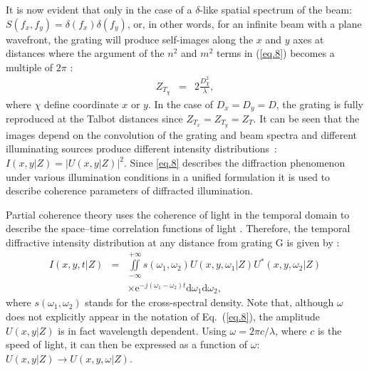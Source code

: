 \documentclass[9pt,twocolumn,twoside]{osajnl}
\begin{document}
It is now evident that only in the case of a $\delta$-like spatial spectrum of the beam: $S\left(f_x, f_y\right)=\delta\left(f_x\right) \delta\left(f_y\right)$, or, in other words, for an infinite beam with a plane wavefront, the grating will produce self-images along the $x$ and $y$ axes at distances where the argument of the $n^2$ and $m^2$ terms in (\ref{eq.8}) becomes a multiple of $2\pi$ \cite{Kovalenko13}:
\begin{eqnarray}
Z_{T_\chi} & =&2\frac{D^2_\chi}{\lambda},
\end{eqnarray}
where $\chi$ define coordinate $x$ or $y$. In the case of $D_x=D_y=D$, the grating is fully reproduced at the Talbot distances since $Z_{T_x}=Z_{T_y}=Z_T$. It can be seen that the images depend on the convolution of the grating and beam spectra and different illuminating sources produce different intensity distributions~\cite{Born01}: $
I(x, y| Z)=\left|U(x, y| Z)\right|^2$. Since \eqref{eq.8} describes the diffraction phenomenon under various illumination conditions in a unified formulation it is used to describe coherence parameters of diffracted illumination.

Partial coherence theory uses the coherence of light in the temporal domain to describe the space--time correlation functions of light \cite{Mandel1995, Li:25}. Therefore, the temporal diffractive intensity distribution at any distance from grating G is given by \cite{Schouten:25}:
\begin{eqnarray}
I\left(x,y,t| Z\right)&=&\iint\limits_{-\infty}^{+\infty}  s\left(\omega_1, \omega_2\right)U(x, y, \omega_1| Z) U^*(x, y, \omega_2| Z)  \nonumber\\&&\times \mathrm{e}^{-j\left(\omega_1 -\omega_2\right)t}\mathrm{d}\omega_1\mathrm{d}\omega_2,
\label{eq.15}
\end{eqnarray}
where $s\left(\omega_1, \omega_2\right)$ stands for the cross-spectral density. Note that, although $\omega$ does not explicitly appear in the notation of Eq.~(\ref{eq.8}), the amplitude $U(x, y| Z)$ is in fact wavelength dependent. Using $\omega = 2\pi c/\lambda$, where $c$ is the speed of light, it can then be expressed as a function of $\omega$:
$U(x, y| Z)\xrightarrow{}U(x, y, \omega| Z)$.
\end{document}
